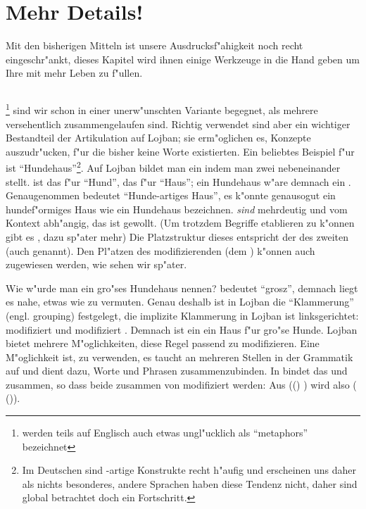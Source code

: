 \chapter{Mehr Details!}
Mit den bisherigen Mitteln ist unsere Ausdrucksf"ahigkeit noch recht eingeschr"ankt, dieses Kapitel wird ihnen einige Werkzeuge in die Hand
geben um Ihre  mit mehr Leben zu f"ullen.

\section{}
 \footnote{ werden teils auf Englisch auch etwas ungl"ucklich als ``metaphors'' bezeichnet} sind wir schon in einer unerw"unschten Variante begegnet, als mehrere  versehentlich zusammengelaufen sind. Richtig
verwendet sind  aber ein wichtiger Bestandteil der Artikulation auf Lojban; sie erm"oglichen es, Konzepte auszudr"ucken, f"ur die
bisher keine Worte existierten. Ein beliebtes Beispiel f"ur  ist ``Hundehaus''\footnote{Im Deutschen sind -artige Konstrukte
recht h"aufig und erscheinen uns daher als nichts besonderes, andere Sprachen haben diese Tendenz nicht, daher sind  global betrachtet doch ein Fortschritt.}. Auf Lojban bildet man ein  indem man zwei  nebeneinander stellt.  ist das  f"ur ``Hund'',  das f"ur ``Haus''; ein Hundehaus w"are demnach ein . Genaugenommen bedeutet 
 ``Hunde-artiges Haus'', es k"onnte genausogut ein hundef"ormiges Haus wie ein Hundehaus bezeichnen.  \emph{sind} mehrdeutig und 
 vom Kontext abh"angig, das ist gewollt. (Um trotzdem Begriffe etablieren zu k"onnen gibt es , dazu sp"ater mehr)
Die Platzstruktur dieses  entspricht der des zweiten  (auch  genannt). Den Pl"atzen des modifizierenden
 (dem ) k"onnen auch  zugewiesen werden, wie sehen wir sp"ater.

Wie w"urde man ein gro"ses Hundehaus nennen?  bedeutet ``grosz'', demnach liegt es nahe, etwas wie  zu vermuten.
Genau deshalb ist in Lojban die ``Klammerung'' (engl. grouping) festgelegt, die implizite Klammerung in Lojban ist linksgerichtet: 
modifiziert  und  modifiziert . Demnach ist ein  ein Haus f"ur gro"se Hunde.
Lojban bietet mehrere M"oglichkeiten, diese Regel passend zu modifizieren. Eine M"oglichkeit ist,  zu verwenden, es taucht an mehreren
Stellen in der Grammatik auf und dient dazu, Worte und Phrasen zusammenzubinden. In  bindet das  
und  zusammen, so dass beide zusammen von  modifiziert werden: Aus (() ) wird also
( ()).

